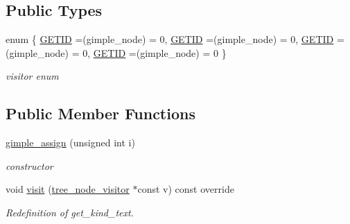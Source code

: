\subsection*{Public Types}
\begin{DoxyCompactItemize}
\item 
enum \{ \hyperlink{structgimple__assign_ad1b5811db57f1826949de9f47bcccab9aef0bbdcaf1875b3a8898f2d8410a64ce}{G\+E\+T\+ID} =(gimple\+\_\+node) = 0, 
\hyperlink{structgimple__assign_ad1b5811db57f1826949de9f47bcccab9aef0bbdcaf1875b3a8898f2d8410a64ce}{G\+E\+T\+ID} =(gimple\+\_\+node) = 0, 
\hyperlink{structgimple__assign_ad1b5811db57f1826949de9f47bcccab9aef0bbdcaf1875b3a8898f2d8410a64ce}{G\+E\+T\+ID} =(gimple\+\_\+node) = 0, 
\hyperlink{structgimple__assign_ad1b5811db57f1826949de9f47bcccab9aef0bbdcaf1875b3a8898f2d8410a64ce}{G\+E\+T\+ID} =(gimple\+\_\+node) = 0
 \}\begin{DoxyCompactList}\small\item\em visitor enum \end{DoxyCompactList}
\end{DoxyCompactItemize}
\subsection*{Public Member Functions}
\begin{DoxyCompactItemize}
\item 
\hyperlink{structgimple__assign_ae6a9baaff7d71e5270b362d981bddf52}{gimple\+\_\+assign} (unsigned int i)
\begin{DoxyCompactList}\small\item\em constructor \end{DoxyCompactList}\item 
void \hyperlink{structgimple__assign_afc25fa9b669662e4f64f09c62284dec2}{visit} (\hyperlink{classtree__node__visitor}{tree\+\_\+node\+\_\+visitor} $\ast$const v) const override
\begin{DoxyCompactList}\small\item\em Redefinition of get\+\_\+kind\+\_\+text. \end{DoxyCompactList}\end{DoxyCompactItemize}
